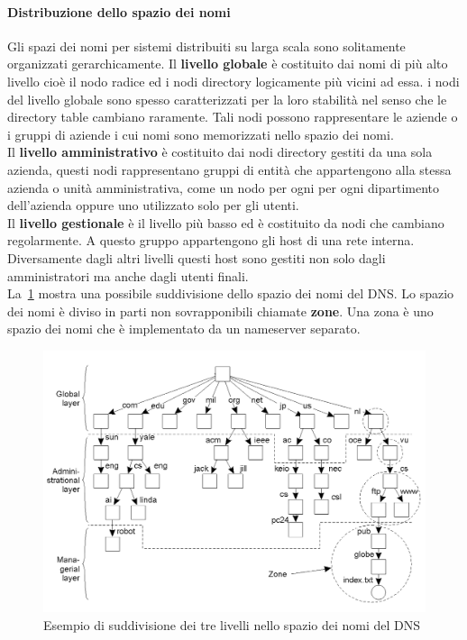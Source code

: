 \paragraph{Distribuzione dello spazio dei nomi}
Gli spazi dei nomi per sistemi distribuiti su larga scala sono solitamente organizzati gerarchicamente. Il \textbf{livello globale} è costituito dai nomi di più alto livello cioè il nodo radice ed i nodi directory logicamente più vicini ad essa. i nodi del livello globale sono spesso caratterizzati per la loro stabilità nel senso che le directory table cambiano raramente. Tali nodi possono rappresentare le aziende o i gruppi di aziende i cui nomi sono memorizzati nello spazio dei nomi.\\
Il \textbf{livello amministrativo} è costituito dai nodi directory gestiti da una sola azienda, questi nodi rappresentano gruppi di entità che appartengono alla stessa azienda o unità amministrativa, come un nodo per ogni per ogni dipartimento dell'azienda oppure uno utilizzato solo per gli utenti.\\
Il \textbf{livello gestionale} è il livello più basso ed è costituito da nodi che cambiano regolarmente. A questo gruppo appartengono gli host di una rete interna. Diversamente dagli altri livelli questi host sono gestiti non solo dagli amministratori ma anche dagli utenti finali.\\
La \figurename\,\ref{img:dnslevel} mostra una possibile suddivisione dello spazio dei nomi del DNS. Lo spazio dei nomi è diviso in parti non sovrapponibili chiamate \textbf{zone}. Una zona è uno spazio dei nomi che è implementato da un nameserver separato.
\begin{figure}
\centering
\includegraphics[scale=0.5]{img/dnslevel.png}
\caption{Esempio di suddivisione dei tre livelli nello spazio dei nomi del DNS}\label{img:dnslevel}
\end{figure}
